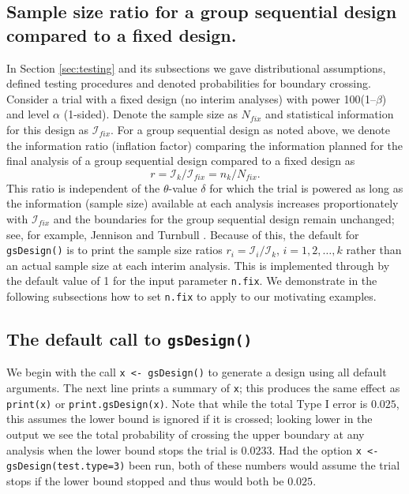\subsection{Sample size ratio for a group sequential design compared to a fixed
design.\label{sec:ssratio}}

In Section \ref{sec:testing} and its subsections we gave distributional assumptions, defined testing procedures and denoted probabilities for boundary crossing.
Consider a trial with a fixed design (no interim analyses) with power 100(1--$\beta$) and level $\alpha$ (1-sided). Denote the sample size as $N_{fix}$ and statistical information for this design as $\mathcal{I}_{fix}$. 
For a group sequential design as noted above, we denote the information ratio (inflation factor) comparing the information planned for the final analysis of a group sequential design compared to a fixed design as
\begin{equation}
r=\mathcal{I}_{k}/\mathcal{I}_{fix}=n_{k}/N_{fix}.\label{ssratio}%
\end{equation}
This ratio is independent of the $\theta$-value $\delta$ for which the trial
is powered as long as the information (sample size) available at each analysis
increases proportionately with $\mathcal{I}_{fix}$ and the boundaries for the group
sequential design remain unchanged; see, for example, Jennison and Turnbull \cite{JTBook}. 
Because of this, the default for \texttt{gsDesign()} is to print the sample size ratios $r_i=\mathcal{I}_i/\mathcal{I}_k$, $i=1,2,\ldots,k$ rather than an actual sample size at each interim analysis. 
This is implemented through by the default value of 1 for the input parameter \texttt{n.fix}. 
We demonstrate in the following subsections how to set \texttt{n.fix} to apply to our motivating examples.

\subsection{The default call to \texttt{gsDesign()}}
We begin with the call 
\verb!x <- gsDesign()!
to generate a design using all default arguments. The next line
prints a summary of \texttt{x}; this produces the same effect as
\texttt{print(x)} or \texttt{print.gsDesign(x)}. Note that while the total
Type I error is $0.025$, this assumes the lower bound is ignored if it is
crossed; looking lower in the output we see the total probability of crossing
the upper boundary at any analysis when the lower bound stops the trial is
$0.0233$. Had the option 
\verb!x <- gsDesign(test.type=3)!
been run, both of these numbers would assume the trial
stops if the lower bound stopped and thus would both be $0.025$. 


